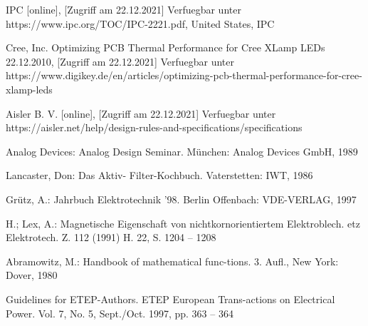 \documentclass[10pt,a4paper,oneside,abstracton]{scrartcl}
\begin{document}
\begin{multicols}{2}
\begin{thebibliography}{9}
IPC  [online], [Zugriff am 22.12.2021] Verfuegbar unter https://www.ipc.org/TOC/IPC-2221.pdf, United States, IPC

Cree, Inc. Optimizing PCB Thermal Performance for Cree XLamp LEDs 22.12.2010, [Zugriff am 22.12.2021] Verfuegbar unter https://www.digikey.de/en/articles/optimizing-pcb-thermal-performance-for-cree-xlamp-leds

Aisler B. V.  [online], [Zugriff am 22.12.2021] Verfuegbar unter https://aisler.net/help/design-rules-and-specifications/specifications












    Analog Devices: Analog Design		Seminar.
 	München: Analog Devices GmbH,
  	1989



  	Lancaster, Don: Das Aktiv-			Filter-Kochbuch. Vaterstetten:  	IWT, 1986 

		
	Grütz, A.: Jahrbuch 				Elektrotechnik ’98. Berlin 			Offenbach: VDE-VERLAG, 				1997

	H.; Lex, A.: Magnetische 			Eigenschaft von 					nichtkornorientiertem 				Elektroblech. etz Elektrotech. 	Z. 112 (1991) H. 22, S. 1204 – 	1208
	
	Abramowitz, M.: Handbook of 		mathematical func-tions. 3. 			Aufl., New York: Dover, 1980
	
	Guidelines for ETEP-Authors. 		ETEP European Trans-actions on 	Electrical Power. Vol. 7, No. 		5, Sept./Oct. 1997, pp. 363 – 		364
  	
\end{thebibliography}

\end{multicols}
 
\end{document}
